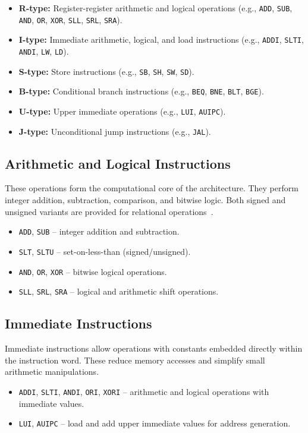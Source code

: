 \begin{itemize}
  \item \textbf{R-type:} Register-register arithmetic and logical operations (e.g., \texttt{ADD}, \texttt{SUB}, \texttt{AND}, \texttt{OR}, \texttt{XOR}, \texttt{SLL}, \texttt{SRL}, \texttt{SRA}).
  \item \textbf{I-type:} Immediate arithmetic, logical, and load instructions (e.g., \texttt{ADDI}, \texttt{SLTI}, \texttt{ANDI}, \texttt{LW}, \texttt{LD}).
  \item \textbf{S-type:} Store instructions (e.g., \texttt{SB}, \texttt{SH}, \texttt{SW}, \texttt{SD}).
  \item \textbf{B-type:} Conditional branch instructions (e.g., \texttt{BEQ}, \texttt{BNE}, \texttt{BLT}, \texttt{BGE}).
  \item \textbf{U-type:} Upper immediate operations (e.g., \texttt{LUI}, \texttt{AUIPC}).
  \item \textbf{J-type:} Unconditional jump instructions (e.g., \texttt{JAL}).
\end{itemize}

\subsection{Arithmetic and Logical Instructions}
These operations form the computational core of the architecture.  
They perform integer addition, subtraction, comparison, and bitwise logic.  
Both signed and unsigned variants are provided for relational operations~\cite{riscv-spec}.
\begin{itemize}
  \item \texttt{ADD}, \texttt{SUB} – integer addition and subtraction.
  \item \texttt{SLT}, \texttt{SLTU} – set-on-less-than (signed/unsigned).
  \item \texttt{AND}, \texttt{OR}, \texttt{XOR} – bitwise logical operations.
  \item \texttt{SLL}, \texttt{SRL}, \texttt{SRA} – logical and arithmetic shift operations.
\end{itemize}

\subsection{Immediate Instructions}
Immediate instructions allow operations with constants embedded directly within the instruction word.  
These reduce memory accesses and simplify small arithmetic manipulations.
\begin{itemize}
  \item \texttt{ADDI}, \texttt{SLTI}, \texttt{ANDI}, \texttt{ORI}, \texttt{XORI} – arithmetic and logical operations with immediate values.
  \item \texttt{LUI}, \texttt{AUIPC} – load and add upper immediate values for address generation.
\end{itemize}

